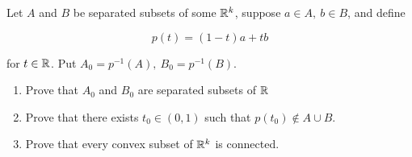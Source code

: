 Let $A$ and $B$ be separated subsets of some $\mathbb{R}^k$, suppose $a \in A,~b \in B$, and define

$$p(t) = (1 - t)a + tb$$

for $t \in \mathbb{R}$. Put $A_0 = p^{-1}(A),~B_0 = p^{-1}(B)$.

\begin{enumerate}
	\item Prove that $A_0$ and $B_0$ are separated subsets of $\mathbb{R}$
	\item Prove that there exists $t_0 \in (0,1)$ such that $p(t_0) \notin A \cup B$.
	\item Prove that every convex subset of $\mathbb{R}^k$ is connected.
\end{enumerate}